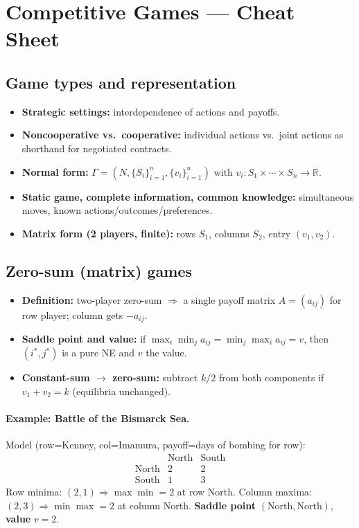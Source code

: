 \documentclass[10pt]{article}
\begin{document}
\section*{Competitive Games — Cheat Sheet}

\subsection*{Game types and representation}
\begin{itemize}
  \item \textbf{Strategic settings:} interdependence of actions and payoffs.
  \item \textbf{Noncooperative vs.\ cooperative:} individual actions vs.\ joint actions as shorthand for negotiated contracts.
  \item \textbf{Normal form:} $\Gamma=(N,\{S_i\}_{i=1}^n,\{v_i\}_{i=1}^n)$ with $v_i:S_1\times\cdots\times S_n\to\mathbb R$.
  \item \textbf{Static game, complete information, common knowledge:} simultaneous moves, known actions/outcomes/preferences.
  \item \textbf{Matrix form (2 players, finite):} rows $S_1$, columns $S_2$, entry $(v_1,v_2)$.
\end{itemize}

\subsection*{Zero-sum (matrix) games}
\begin{itemize}
  \item \textbf{Definition:} two-player zero-sum $\Rightarrow$ a single payoff matrix $A=(a_{ij})$ for row player; column gets $-a_{ij}$.
  \item \textbf{Saddle point and value:} if $\max_i\min_j a_{ij}=\min_j\max_i a_{ij}=v$, then $(i^*,j^*)$ is a pure NE and $v$ the value.
  \item \textbf{Constant-sum $\to$ zero-sum:} subtract $k/2$ from both components if $v_1+v_2=k$ (equilibria unchanged).
\end{itemize}

\paragraph{Example: Battle of the Bismarck Sea.}
Model (row=Kenney, col=Imamura, payoff=days of bombing for row):
\[
\begin{array}{c|cc}
 & \text{North} & \text{South}\\\hline
\text{North} & 2 & 2\\
\text{South} & 1 & 3
\end{array}
\]
Row minima: $(2,1)\Rightarrow \max\min=2$ at row North. Column maxima: $(2,3)\Rightarrow \min\max=2$ at column North.
\textbf{Saddle point} $(\text{North},\text{North})$, \textbf{value} $v=2$.
\end{document}

